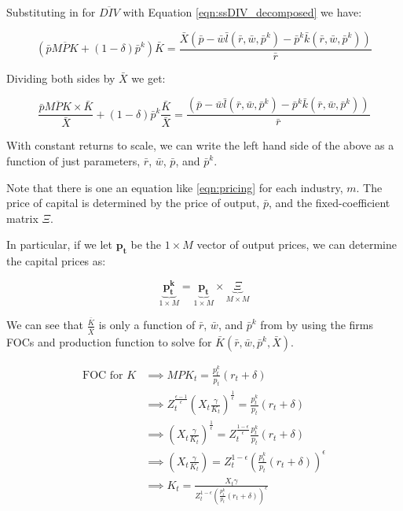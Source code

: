 \documentclass[letterpaper,12pt]{article}
\theoremstyle{definition}
\begin{document}
\begin{spacing}{1.5}
Substituting in for $\overline{DIV}$ with Equation \ref{eqn:ssDIV_decomposed} we have:

\begin{equation}
\left(\bar{p}\overline{MPK} + (1-\delta)\bar{p}^{k}\right)\bar{K} =  \frac{\bar{X}\left(\bar{p} - \bar{w}\bar{l}(\bar{r},\bar{w},\bar{p}^{k}) - \bar{p}^{k}\bar{k}(\bar{r},\bar{w},\bar{p}^{k})\right)}{\bar{r}}
\end{equation} 

Dividing both sides by $\bar{X}$ we get:


\begin{equation}
\label{eqn:pricing}
\frac{\bar{p}\overline{MPK} \times \bar{K}}{\bar{X}} + (1-\delta)\bar{p}^{k}\frac{\bar{K}}{\bar{X}} =  \frac{\left(\bar{p} - \bar{w}\bar{l}(\bar{r},\bar{w},\bar{p}^{k}) - \bar{p}^{k}\bar{k}(\bar{r},\bar{w},\bar{p}^{k})\right)}{\bar{r}}
\end{equation} 

With constant returns to scale, we can write the left hand side of the above as a function of just parameters, $\bar{r}$, $\bar{w}$, $\bar{p}$, and $\bar{p}^{k}$.

Note that there is one an equation like \ref{eqn:pricing} for each industry, $m$.  The price of capital is determined by the price of output, $\bar{p}$, and the fixed-coefficient matrix $\Xi$.

In particular, if we let $\boldsymbol{p_{t}}$ be the $1\times M$ vector of output prices, we can determine the capital prices as:

\begin{equation}
\label{eqn:capital_prices}
\underbrace{\boldsymbol{p^{k}_{t}}}_{1\times M} =\underbrace{\boldsymbol{p_{t}}}_{1\times M} \times  \underbrace{\Xi}_{M\times M}
\end{equation}

We can see that $\frac{\bar{K}}{\bar{X}}$ is only a function of $\bar{r}$, $\bar{w}$, and $\bar{p}^{k}$ from by using the firms FOCs and production function to solve for $\bar{K}(\bar{r},\bar{w},\bar{p}^{k},\bar{X})$.

\begin{equation}
\begin{split}
\text{FOC for $K$}& \implies MPK_{t} = \frac{p^{k}_{t}}{p_{t}}(r_{t}+\delta)\\
& \implies Z_{t}^{\frac{\epsilon-1}{\epsilon}}\left(X_{t}\frac{\gamma}{K_{t}}\right)^{\frac{1}{\epsilon}} = \frac{p^{k}_{t}}{p_{t}}(r_{t}+\delta)\\
& \implies\left(X_{t}\frac{\gamma}{K_{t}}\right)^{\frac{1}{\epsilon}} =  Z_{t}^{\frac{1-\epsilon}{\epsilon}}\frac{p^{k}_{t}}{p_{t}}(r_{t}+\delta) \\
& \implies\left(X_{t}\frac{\gamma}{K_{t}}\right) =  Z_{t}^{1-\epsilon}\left(\frac{p^{k}_{t}}{p_{t}}(r_{t}+\delta)\right)^{\epsilon} \\
& \implies K_{t} = \frac{X_{t}\gamma}{Z_{t}^{1-\epsilon}\left(\frac{p^{k}_{t}}{p_{t}}(r_{t}+\delta)\right)^{\epsilon}} \\
\end{split}
\end{equation}


\end{spacing}
\end{document}
